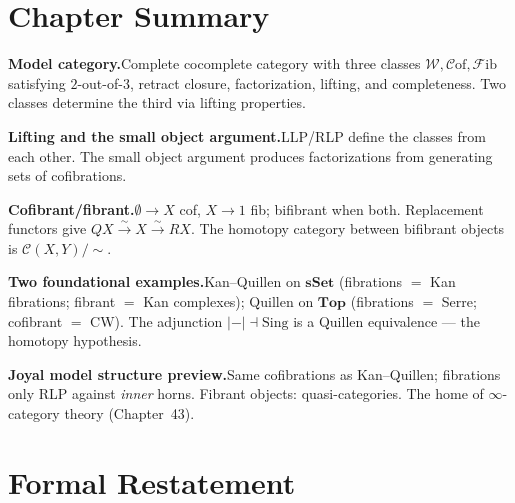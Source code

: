 \section*{Chapter Summary}

\begin{summarybox}
\textbf{Model category.}\quad Complete cocomplete category with three classes
$\mathcal{W}, \mathcal{C}\mathrm{of}, \mathcal{F}\mathrm{ib}$ satisfying
$2$-out-of-$3$, retract closure, factorization, lifting, and completeness.
Two classes determine the third via lifting properties.

\textbf{Lifting and the small object argument.}\quad LLP/RLP define the
classes from each other. The small object argument produces factorizations
from generating sets of cofibrations.

\textbf{Cofibrant/fibrant.}\quad $\emptyset \to X$ cof, $X \to 1$ fib;
bifibrant when both. Replacement functors give $QX \xrightarrow{\sim} X
\xrightarrow{\sim} RX$. The homotopy category between bifibrant objects
is $\mathcal{C}(X, Y)/\!\sim$.

\textbf{Two foundational examples.}\quad Kan--Quillen on $\mathbf{sSet}$
(fibrations $=$ Kan fibrations; fibrant $=$ Kan complexes); Quillen on
$\mathbf{Top}$ (fibrations $=$ Serre; cofibrant $=$ CW). The adjunction
$\lvert{-}\rvert \dashv \mathrm{Sing}$ is a Quillen equivalence —
the homotopy hypothesis.

\textbf{Joyal model structure preview.}\quad Same cofibrations as
Kan--Quillen; fibrations only RLP against \emph{inner} horns. Fibrant
objects: quasi-categories. The home of $\infty$-category theory (Chapter~43).
\end{summarybox}


\section*{Formal Restatement}

